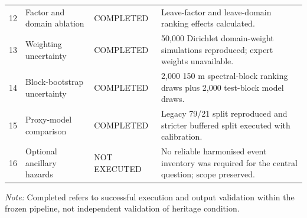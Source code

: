 \begin{longtable}{p{}p{}p{}p{}}
12 & Factor and domain ablation & COMPLETED & Leave-factor and leave-domain ranking effects calculated. \\
13 & Weighting uncertainty & COMPLETED & 50,000 Dirichlet domain-weight simulations reproduced; expert weights unavailable. \\
14 & Block-bootstrap uncertainty & COMPLETED & 2,000 150 m spectral-block ranking draws plus 2,000 test-block model draws. \\
15 & Proxy-model comparison & COMPLETED & Legacy 79/21 split reproduced and stricter buffered split executed with calibration. \\
16 & Optional ancillary hazards & NOT EXECUTED & No reliable harmonised event inventory was required for the central question; scope preserved. \\
\end{longtable}
\noindent\textit{Note:} Completed refers to successful execution and output validation within the frozen pipeline, not independent validation of heritage condition.
\endgroup
